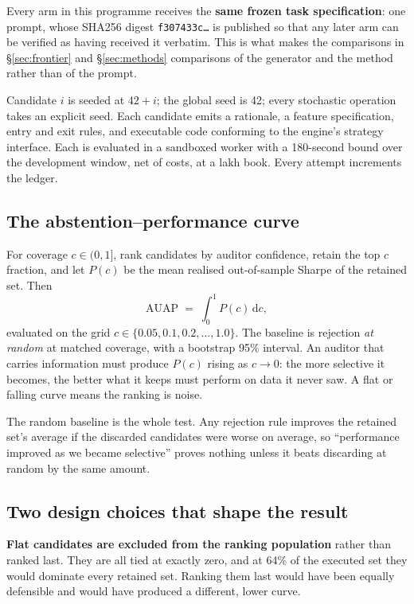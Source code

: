 \documentclass[11pt,a4paper]{article}
\begin{document}
Every arm in this programme receives the \textbf{same frozen task specification}: one prompt,
whose SHA256 digest \texttt{f307433c\ldots} is published so that any later arm can be verified as
having received it verbatim. This is what makes the comparisons in \S\ref{sec:frontier} and
\S\ref{sec:methods} comparisons of the generator and the method rather than of the prompt.

Candidate $i$ is seeded at $42+i$; the global seed is 42; every stochastic operation takes an
explicit seed. Each candidate emits a rationale, a feature specification, entry and exit rules,
and executable code conforming to the engine's strategy interface. Each is evaluated in a
sandboxed worker with a 180-second bound over the development window, net of costs, at a
 lakh book. Every attempt increments the ledger.

\subsection{The abstention--performance curve}

For coverage $c \in (0,1]$, rank candidates by auditor confidence, retain the top $c$ fraction,
and let $P(c)$ be the mean realised out-of-sample Sharpe of the retained set. Then
\[
\mathrm{AUAP} \;=\; \int_0^1 P(c)\, \mathrm{d}c,
\]
evaluated on the grid $c \in \{0.05, 0.1, 0.2, \ldots, 1.0\}$. The baseline is rejection
\emph{at random} at matched coverage, with a bootstrap 95\% interval. An auditor that carries
information must produce $P(c)$ rising as $c \to 0$: the more selective it becomes, the better
what it keeps must perform on data it never saw. A flat or falling curve means the ranking is
noise.

The random baseline is the whole test. Any rejection rule improves the retained set's average if
the discarded candidates were worse on average, so ``performance improved as we became
selective'' proves nothing unless it beats discarding at random by the same amount.

\subsection{Two design choices that shape the result}

\textbf{Flat candidates are excluded from the ranking population} rather than ranked last. They
are all tied at exactly zero, and at 64\% of the executed set they would dominate every retained
set. Ranking them last would have been equally defensible and would have produced a different,
lower curve.
\end{document}
